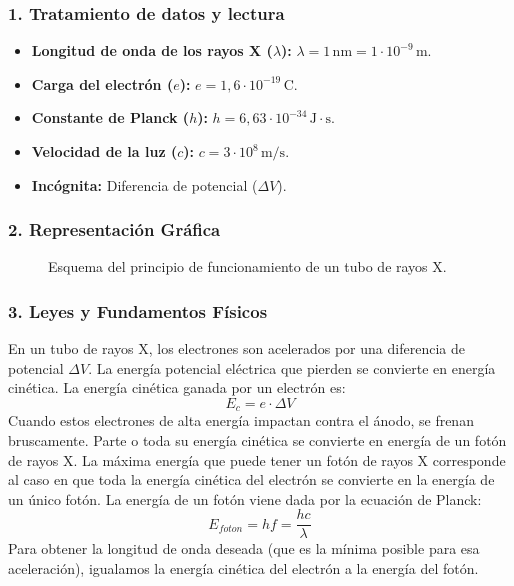 \subsubsection*{1. Tratamiento de datos y lectura}
\begin{itemize}
    \item \textbf{Longitud de onda de los rayos X ($\lambda$):} $\lambda = 1 \, \text{nm} = 1 \cdot 10^{-9} \, \text{m}$.
    \item \textbf{Carga del electrón ($e$):} $e = 1,6 \cdot 10^{-19} \, \text{C}$.
    \item \textbf{Constante de Planck ($h$):} $h = 6,63 \cdot 10^{-34} \, \text{J}\cdot\text{s}$.
    \item \textbf{Velocidad de la luz ($c$):} $c = 3 \cdot 10^8 \, \text{m/s}$.
    \item \textbf{Incógnita:} Diferencia de potencial ($\Delta V$).
\end{itemize}

\subsubsection*{2. Representación Gráfica}
\begin{figure}[H]
    \centering
    \caption{Esquema del principio de funcionamiento de un tubo de rayos X.}
\end{figure}

\subsubsection*{3. Leyes y Fundamentos Físicos}
En un tubo de rayos X, los electrones son acelerados por una diferencia de potencial $\Delta V$. La energía potencial eléctrica que pierden se convierte en energía cinética. La energía cinética ganada por un electrón es:
$$ E_c = e \cdot \Delta V $$
Cuando estos electrones de alta energía impactan contra el ánodo, se frenan bruscamente. Parte o toda su energía cinética se convierte en energía de un fotón de rayos X. La máxima energía que puede tener un fotón de rayos X corresponde al caso en que toda la energía cinética del electrón se convierte en la energía de un único fotón. La energía de un fotón viene dada por la ecuación de Planck:
$$ E_{foton} = hf = \frac{hc}{\lambda} $$
Para obtener la longitud de onda deseada (que es la mínima posible para esa aceleración), igualamos la energía cinética del electrón a la energía del fotón.

